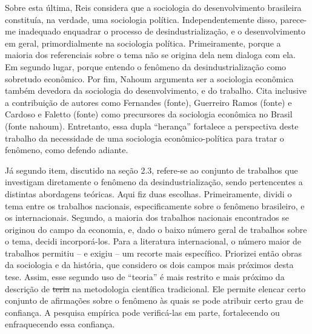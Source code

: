 Sobre esta última, Reis  considera que a sociologia do desenvolvimento brasileira constituía, na verdade, uma sociologia política. Independentemente disso, parece-me inadequado enquadrar o processo de desindustrialização, e o desenvolvimento em geral, primordialmente na sociologia política. Primeiramente, porque a maioria dos referenciais sobre o tema não se origina dela nem dialoga com ela. Em segundo lugar, porque entendo o fenômeno da desindustrialização como sobretudo econômico. Por fim, Nahoum  argumenta ser a sociologia econômica também devedora da sociologia do desenvolvimento, e do trabalho. Cita inclusive a contribuição de autores como Fernandes (fonte), Guerreiro Ramos (fonte) e Cardoso e Faletto (fonte) como precursores da sociologia econômica no Brasil (fonte nahoum). Entretanto, essa dupla ``herança'' fortalece a perspectiva deste trabalho da necessidade de uma sociologia econômico-política para tratar o fenômeno, como defendo adiante.

Já  segundo item, discutido na seção 2.3, refere-se ao conjunto de trabalhos que investigam diretamente
o fenômeno da desindustrialização, sendo pertencentes a distintas abordagens teóricas. Aqui fiz duas escolhas. Primeiramente, dividi o tema entre os trabalhos nacionais, especificamente sobre o fenômeno brasileiro, e os internacionais. Segundo, a maioria dos trabalhos nacionais encontrados se originou do campo da economia, e, dado o baixo número geral de trabalhos sobre o tema, decidi incorporá-los. Para a literatura internacional, o número maior
de trabalhos permitiu -- e exigiu -- um recorte mais específico. Priorizei então obras da sociologia e da história, que considero os dois campos mais próximos desta tese. Assim, esse segundo uso de ``teoria'' é mais restrito e
mais próximo da descrição de \sout{teria} na metodologia científica tradicional. Ele permite elencar certo conjunto
de afirmações sobre o fenômeno às quais se pode atribuir certo grau de confiança. A pesquisa empírica pode verificá-las em parte, fortalecendo ou enfraquecendo essa confiança.

